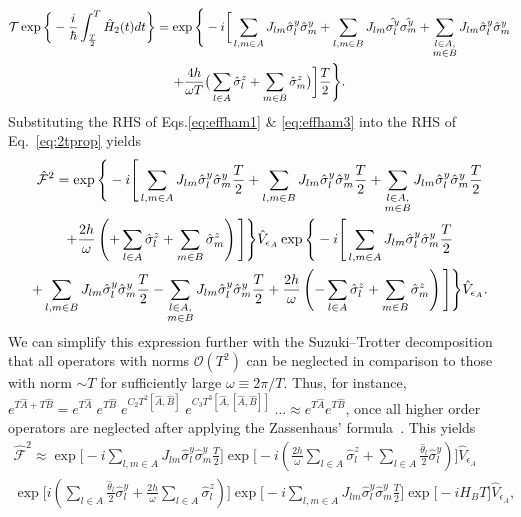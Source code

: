 \documentclass[12pt]{iopart}
\begin{document}
\begin{multline}
    \mathcal{T}\exp\bigg\{-\frac{i}{\hbar}\int_{\frac{T}{2}}^{T} \hat{H}_2(t) dt\bigg\} = \exp\Bigg\{-i \bigg[ \sum_{l,m\in A}J_{lm} \hat{\sigma}_l^y\hat{\sigma}_m^y +\sum_{l,m\in B}J_{lm}
    \hat{\sigma_l^y}\hat{\sigma_m^y}+\sum_{\substack{%
            l \in A,\\
            m \in B\hfill}} J_{lm}\hat{\sigma}^y_l\hat{\sigma}^y_m\\
    +\frac{4h}{\omega T}\big( \sum_{l\in A}^{}\hat{\sigma}^z_l + \sum_{m\in B}^{}\hat{\sigma}^z_m\big)\bigg]\frac{T}{2}\Bigg\}.
    \label{eq:effham3}
\end{multline}	
Substituting the RHS of Eqs.\eqref{eq:effham1} \& \eqref{eq:effham3} into the RHS of Eq.~\eqref{eq:2tprop} yields    	
\begin{multline}
    \hat{\mathcal{F}}^2 
    = \exp\Bigg\{-i \Bigg[ \sum_{l,m\in A}J_{lm} \hat{\sigma}^y_l\hat{\sigma}^y_m\frac{T}{2} +\sum_{l,m\in B}J_{lm} \hat{\sigma}^y_l\hat{\sigma}^y_m\frac{T}{2}+\sum_{\substack{%
            l \in A,\\
            m \in B\hfill}} J_{lm}\hat{\sigma}^y_l\hat{\sigma}^y_m\frac{T}{2} \\
            +\frac{2h}{\omega }\left( +\sum_{l\in A}^{}\hat{\sigma}^z_l + \sum_{m\in B}^{}\hat{\sigma}^z_m\right)\Bigg]\Bigg\} \hat{V}_{\epsilon_A} \exp\Bigg\{-i \Bigg[ \sum_{l,m\in A}J_{lm} \hat{\sigma}^y_l\hat{\sigma}^y_m\frac{T}{2}\\ +\sum_{l,m\in B}J_{lm} \hat{\sigma}^y_l\hat{\sigma}^y_m\frac{T}{2}
            -\sum_{\substack{%
            l \in A,\\
            m \in B\hfill}} J_{lm}\hat{\sigma}^y_l\hat{\sigma}^y_m\frac{T}{2} +\frac{2h}{\omega}\left( -\sum_{l\in A}^{}\hat{\sigma}^z_l + \sum_{m\in B}^{}\hat{\sigma}^z_m\right)\Bigg]\Bigg\} \hat{V}_{\epsilon_A}.\nonumber
\end{multline}
We can simplify this expression further with the Suzuki–Trotter decomposition\cite{Ostmeyer_2023, Hatano2005} that all operators with norms $\mathcal{O}(T^2)$ can be neglected in comparison to those with norm $\sim T$ for sufficiently large $\omega\equiv 2\pi/T$. Thus, for instance, $e^{T\hat{A} + T\hat{B}}= e^{T\hat{A}}\; e^{T\hat{B}}\;e^{C_2 T^2\left[\hat{A}, \hat{B}\right]}\;e^{C_3 T^3\left[\hat{A},\left[\hat{A}, \hat{B}\right]\right]}\;\dots \approx e^{T\hat{A}} e^{T\hat{B}}$, once all higher order operators are neglected after applying the Zassenhaus' formula~\cite{Magnus1954}. This yields
\begin{multline}	
    \hat{\mathcal{F}}^2 	\approx\exp\Bigg[-i \sum_{l,m\in A}J_{lm} \hat{\sigma}^y_l\hat{\sigma}^y_m\frac{T}{2}\Bigg] \exp\Bigg[-i\left(\frac{2h}{\omega } \sum_{l\in A}^{}\hat{\sigma}^z_l + \sum_{l \in A}\frac{\hat{\theta}_{l}}{2}\hat{\sigma}^y_l\right)\Bigg] 
    \hat{V}_{\epsilon_A} \\
    \exp\Bigg[i \left(\sum_{l \in A}\frac{\hat{\theta}_{l}}{2}\hat{\sigma}^y_l + \frac{2h}{\omega} \sum_{l\in A}^{}\hat{\sigma}^z_l\right)\Bigg] \exp\Bigg[-i\sum_{l,m\in A}J_{lm} \hat{\sigma}^y_l\hat{\sigma}^y_m\frac{T}{2}\Bigg] \exp\big[-i H_B T\big]\hat{V}_{\epsilon_A},\nonumber
\end{multline}
\end{document}
